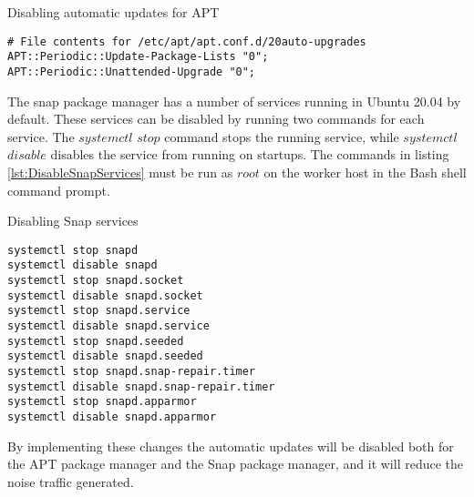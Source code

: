\begin{listing}[!ht]
\caption{Disabling automatic updates for APT}
\label{lst:AutoUpgradesApt}
\begin{verbatim}
# File contents for /etc/apt/apt.conf.d/20auto-upgrades
APT::Periodic::Update-Package-Lists "0";
APT::Periodic::Unattended-Upgrade "0";
\end{verbatim}
\end{listing}
The snap package manager has a number of services running in Ubuntu 20.04 by default.
These services can be disabled by running two commands for each service.
The $systemctl$ $stop$ command stops the running service, while $systemctl$ $disable$ disables the service from running on startups. The commands in listing \ref{lst:DisableSnapServices} must be run as $root$ on the worker host in the Bash shell command prompt.
\begin{listing}[!ht]
\caption{Disabling Snap services}
\label{lst:DisableSnapServices}
\begin{verbatim}
systemctl stop snapd
systemctl disable snapd
systemctl stop snapd.socket
systemctl disable snapd.socket
systemctl stop snapd.service
systemctl disable snapd.service
systemctl stop snapd.seeded
systemctl disable snapd.seeded
systemctl stop snapd.snap-repair.timer
systemctl disable snapd.snap-repair.timer
systemctl stop snapd.apparmor
systemctl disable snapd.apparmor
\end{verbatim}
\end{listing}

By implementing these changes the automatic updates will be disabled both for the APT package manager and the Snap package manager, and it will reduce the noise traffic generated.